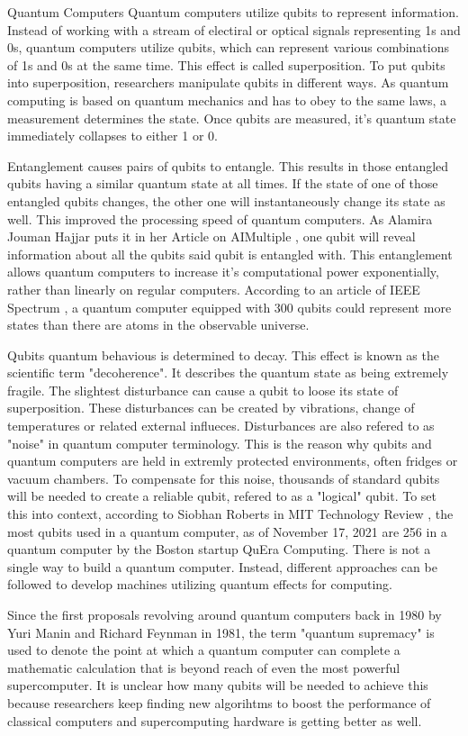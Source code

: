 \documentclass[aps,preprintnumbers,twocolumn]{revtex4}
\begin{document}
\begin{section}{Quantum Computers}
Quantum computers utilize qubits to represent information. 
Instead of working with a stream of electiral or optical signals representing 1s and 0s, 
quantum computers utilize qubits, which can represent various combinations of 1s and 0s at the same time. 
This effect is called superposition. To put qubits into superposition, 
researchers manipulate qubits in different ways. As quantum computing is based on quantum mechanics and has to obey to the same laws, 
a measurement determines the state. Once qubits are measured, 
it's quantum state immediately collapses to either 1 or 0.

Entanglement causes pairs of qubits to entangle.
This results in those entangled qubits having a similar quantum state at all times.
If the state of one of those entangled qubits changes,
the other one will instantaneously change its state as well. This improved the processing speed of quantum computers. As Alamira Jouman Hajjar puts it in her Article on AIMultiple \cite{AIMultiple}, one qubit will reveal information about all the qubits said qubit is entangled with.
This entanglement allows quantum computers to increase it's computational power exponentially,
rather than linearly on regular computers.
According to an article of IEEE Spectrum \cite{IEEE}, a quantum computer equipped with 300 qubits could represent more states than there are atoms in the observable universe.

Qubits quantum behavious is determined to decay.
This effect is known as the scientific term "decoherence".
It describes the quantum state as being extremely fragile.
The slightest disturbance can cause a qubit to loose its state of superposition.
These disturbances can be created by vibrations, change of temperatures or related external influeces.
Disturbances are also refered to as "noise" in quantum computer terminology.
This is the reason why qubits and quantum computers are held in extremly protected environments, 
often fridges or vacuum chambers.
To compensate for this noise, 
thousands of standard qubits will be needed to create a reliable qubit, 
refered to as a "logical" qubit. 
To set this into context, 
according to Siobhan Roberts in MIT Technology Review \cite{MIT}, 
the most qubits used in a quantum computer, 
as of November 17, 2021 are 256 in a quantum computer by the Boston startup QuEra Computing. 
There is not a single way to build a quantum computer. 
Instead, different approaches can be followed to develop machines utilizing quantum effects for computing.

Since the first proposals revolving around quantum computers back in 1980 by Yuri Manin and Richard Feynman in 1981,
the term "quantum supremacy" is used to denote the point at which a quantum computer can complete a mathematic calculation that is beyond reach of even the most powerful supercomputer.
It is unclear how many qubits will be needed to achieve this because researchers keep finding new algorihtms to boost the performance of classical computers and supercomputing hardware is getting better as well.

\end{section}
\end{document}

